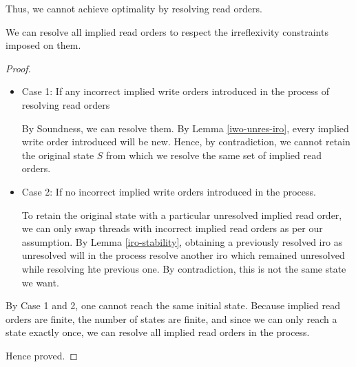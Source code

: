         Thus, we cannot achieve optimality by resolving read orders. 

        \begin{theorem}
            \label{fwdprog-iro}
            We can resolve all implied read orders to respect the irreflexivity constraints imposed on them.
        \end{theorem}

        \begin{proof}

            \begin{itemize}
                \item Case 1: If any incorrect implied write orders introduced in the process of resolving read orders 

                    By Soundness, we can resolve them. 
                    By Lemma \ref{iwo-unres-iro}, every implied write order introduced will be new.
                    Hence, by contradiction, we cannot retain the original state $S$ from which we resolve the same set of implied read orders. 

                \item Case 2: If no incorrect implied write orders introduced in the process.

                    To retain the original state with a particular unresolved implied read order, we can only swap threads with incorrect implied read orders as per our assumption. 
                    By Lemma \ref{iro-stability}, obtaining a previously resolved iro as unresolved will in the process resolve another iro which remained unresolved while resolving hte previous one.
                    By contradiction, this is not the same state we want. \
            \end{itemize}

            By Case 1 and 2, one cannot reach the same initial state.
            Because implied read orders are finite, the number of states are finite, and since we can only reach a state exactly once, 
            we can resolve all implied read orders in the process. 

            Hence proved.

        \end{proof}

